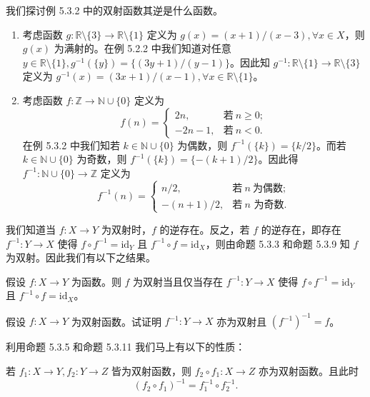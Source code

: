 \begin{example}
我们探讨例 5.3.2 中的双射函数其逆是什么函数。
\begin{enumerate}
    \item 考虑函数 $g : \mathbb{R} \setminus \{3\} \to \mathbb{R} \setminus \{1\}$ 定义为 $g(x) = (x + 1)/(x - 3), \forall x \in X$，则 $g(x)$ 为满射的。在例 5.2.2 中我们知道对任意 $y \in \mathbb{R} \setminus \{1\}, g^{-1}(\{y\}) = \{(3y + 1)/(y - 1)\}$。因此知 $g^{-1} : \mathbb{R} \setminus \{1\} \to \mathbb{R} \setminus \{3\}$ 定义为 $g^{-1}(x) = (3x + 1)/(x - 1), \forall x \in \mathbb{R} \setminus \{1\}$。
    \item 考虑函数 $f : \mathbb{Z} \to \mathbb{N} \cup \{0\}$ 定义为
    $$ f(n) = \begin{cases} 2n, & \text{若}~ n \geq 0; \\ -2n - 1, & \text{若}~ n < 0. \end{cases} $$
    在例 5.3.2 中我们知若 $k \in \mathbb{N} \cup \{0\}$ 为偶数，则 $f^{-1}(\{k\}) = \{k/2\}$。而若 $k \in \mathbb{N} \cup \{0\}$ 为奇数，则 $f^{-1}(\{k\}) = \{-(k + 1)/2\}$。因此得 $f^{-1} : \mathbb{N} \cup \{0\} \to \mathbb{Z}$ 定义为
    $$ f^{-1}(n) = \begin{cases} n/2, & \text{若}~ n ~\text{为偶数}; \\ -(n + 1)/2, & \text{若}~ n \text{ 为奇数}. \end{cases} $$
\end{enumerate}
\end{example}

我们知道当 $f : X \to Y$ 为双射时，$f$ 的逆存在。反之，若 $f$ 的逆存在，即存在 $f^{-1} : Y \to X$ 使得 $f \circ f^{-1} = \mathrm{id}_Y$ 且 $f^{-1} \circ f = \mathrm{id}_X$，则由命题 5.3.3 和命题 5.3.9 知 $f$ 为双射。因此我们有以下之结果。

\begin{proposition}
假设 $f : X \to Y$ 为函数。则 $f$ 为双射当且仅当存在 $f^{-1} : Y \to X$ 使得 $f \circ f^{-1} = \mathrm{id}_Y$ 且 $f^{-1} \circ f = \mathrm{id}_X$。
\end{proposition}

\begin{question}
假设 $f : X \to Y$ 为双射函数。试证明 $f^{-1} : Y \to X$ 亦为双射且 $(f^{-1})^{-1} = f$。
\end{question}

利用命题 5.3.5 和命题 5.3.11 我们马上有以下的性质：

\begin{proposition}
若 $f_1 : X \to Y, f_2 : Y \to Z$ 皆为双射函数，则 $f_2 \circ f_1 : X \to Z$ 亦为双射函数。且此时
$$ (f_2 \circ f_1)^{-1} = f_1^{-1} \circ f_2^{-1}. $$
\end{proposition}

